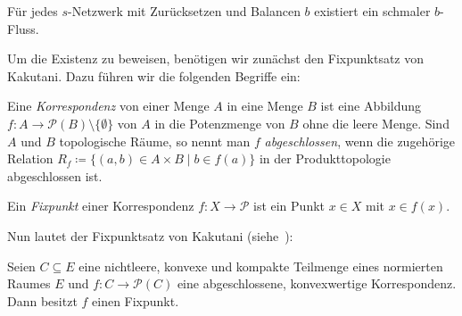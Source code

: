 \begin{theorem}\label{thm-existence-thin-flow}
	Für jedes $s$-Netzwerk mit Zurücksetzen und Balancen $b$ existiert ein schmaler $b$-Fluss.
\end{theorem}

Um die Existenz zu beweisen, benötigen wir zunächst den Fixpunktsatz von Kakutani.
Dazu führen wir die folgenden Begriffe ein:

\begin{definition}
	Eine \emph{Korrespondenz} von einer Menge $A$ in eine Menge $B$ ist eine Abbildung $f: A \to \mathcal{P}(B)\setminus \{ \emptyset \}$ von $A$ in die Potenzmenge von $B$ ohne die leere Menge.
	Sind $A$ und $B$ topologische Räume, so nennt man $f$ \emph{abgeschlossen}, wenn die zugehörige Relation $R_f \coloneq \{ (a,b) \in A\times B \mid b\in f(a) \}$ in der Produkttopologie abgeschlossen ist.

	Ein \emph{Fixpunkt} einer Korrespondenz $f: X \to \mathcal{P}$ ist ein Punkt $x\in X$ mit $x\in f(x)$.
\end{definition}

Nun lautet der Fixpunktsatz von Kakutani (siehe~\cite{Heuser1991Fix}):

\begin{satz}\label{satz-kakutani}
	Seien $C\subseteq E$ eine nichtleere, konvexe und kompakte Teilmenge eines normierten Raumes $E$ und $f: C \to \mathcal{P}(C)$ eine abgeschlossene, konvexwertige Korrespondenz.
	Dann besitzt $f$ einen Fixpunkt.
\end{satz}

